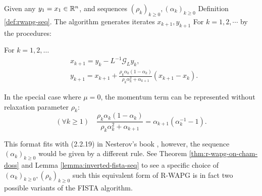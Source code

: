 \documentclass[12pt]{article}
\begin{document}
        \begin{definition}\label{def:r-wapg-momentum-form}
            Given any $y_1 = x_1 \in \mathbb R^n$, and sequences $(\rho_k)_{k \ge 0}, (\alpha_k)_{k\ge 0}$ Definition \ref{def:rwapg-seq}. 
            The algorithm generates iterates $x_{k + 1}, y_{k + 1}$ For $k = 1, 2, \cdots $ by the procedures: 
            \begin{tcolorbox}
                For $k=1, 2,\ldots $
                \begin{align*}
                    & x_{k + 1} = y_k - L^{-1}\mathcal G_Ly_k, 
                    \\
                    & 
                    y_{k + 1} = 
                    x_{k + 1} + 
                    \frac{\rho_k\alpha_k(1 - \alpha_k)}{\rho_k\alpha_k^2 + \alpha_{k + 1}}(x_{k + 1} - x_k). 
                \end{align*}    
            \end{tcolorbox}
            In the special case where $\mu = 0$, the momentum term can be represented without relaxation parameter $\rho_k$: 
            $$
                (\forall k \ge 1)\quad \frac{\rho_k\alpha_k(1 - \alpha_k)}{\rho_k\alpha_k^2 + \alpha_{k + 1}} 
                = \alpha_{k + 1}(\alpha_k^{-1} - 1). 
            $$
        \end{definition}
        \begin{remark}
            This format fits with (2.2.19) in Nesterov's book \cite{nesterov_lectures_2018}, however, the sequence $(\alpha_k)_{k \ge 0}$ would be given by a different rule. 
            See Theorem \ref{thm:r-wapg-on-cham-doss} and Lemma \ref{lemma:inverted-fista-seq} to see a specific choice of $(\alpha_k)_{k \ge0}, (\rho_k)_{ k\ge 0}$ such this equivalent form of R-WAPG is in fact two possible variants of the FISTA algorithm.
        \end{remark}
\end{document}
